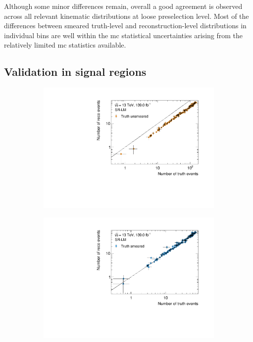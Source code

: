 Although some minor differences remain, overall a good agreement is observed across all relevant kinematic distributions at loose preselection level. Most of the differences between smeared truth-level and reconstruction-level distributions in individual bins are well within the \gls{mc} statistical uncertainties arising from the relatively limited \gls{mc} statistics available.
 
 \subsection{Validation in signal regions}

 \begin{figure}
	\centering
	\begin{subfigure}[b]{0.49\linewidth}
		\centering\includegraphics[width=\textwidth]{yields_SR-LM_unsmeared}
	\end{subfigure}\hfill
	\begin{subfigure}[b]{0.49\linewidth}
		\centering\includegraphics[width=\textwidth]{yields_SR-LM_smeared}

\end{subfigure}
\end{figure}
